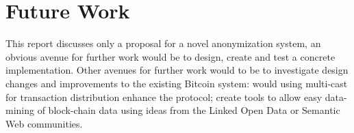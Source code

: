 \section{Future Work}
This report discusses only a proposal for a novel anonymization system, an obvious avenue for further work would be to design, create and test a concrete implementation. Other avenues for further work would to be to investigate design changes and improvements to the existing Bitcoin system: would using multi-cast for transaction distribution enhance the protocol; create tools to allow easy data-mining of block-chain data using ideas from the Linked Open Data or Semantic Web communities.







%
%

